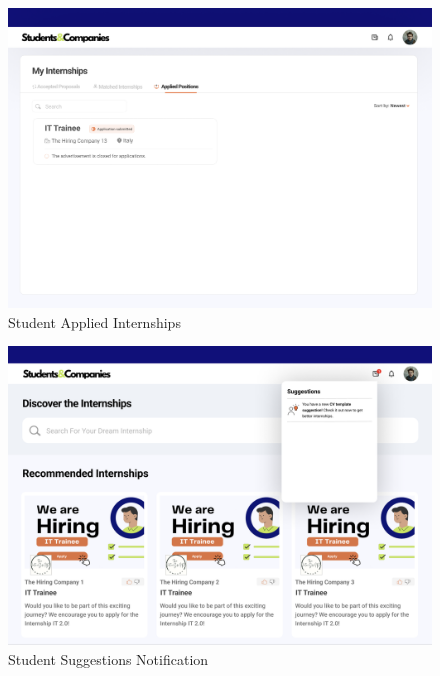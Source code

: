 \documentclass[a4paper,12pt]{article}
\begin{document}
\begin{figure}[H]
    \centering
    \includegraphics[scale = 0.42]{figures/UserInterfaces/Student/AppliedPositions.png}
    \caption{Student Applied Internships}
     \centering
\end{figure}
\begin{figure}[H]
    \centering
    \includegraphics[scale = 0.42]{figures/UserInterfaces/Student/SuggestionNotification.png}
    \caption{Student Suggestions Notification}
     \centering
\end{figure}
\end{document}
